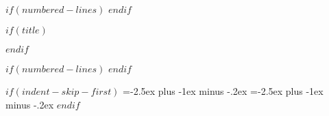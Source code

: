 $if(numbered-lines)$
\linenumbers
$endif$

$if(title)$
\maketitle
$endif$

$if(numbered-lines)$
\resetlinenumber[1]
$endif$

$if(indent-skip-first)$
\makeatletter
\b@level@one@skip=-2.5ex plus -1ex minus -.2ex
\b@level@two@skip=-2.5ex plus -1ex minus -.2ex
\makeatother
\setlength\parindent{1cm}
\setlength\parskip{0cm}
$endif$
